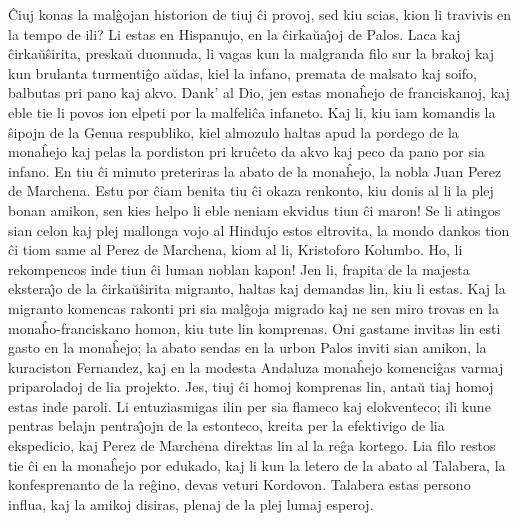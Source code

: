    \^Ciuj konas la mal\^gojan historion de tiuj \^ci provoj, sed kiu scias,
kion li travivis en la tempo de ili? Li estas en Hispanujo, en la
\^cirka\u ua\^{\j}oj de Palos. Laca kaj \^cirka\u u\^sirita,
preska\u u duonnuda, li vagas kun la malgranda filo sur la brakoj
kaj kun brulanta turmenti\^go a\u udas, kiel la infano, premata de
malsato kaj soifo, balbutas pri pano kaj akvo. Dank' al Dio, jen
estas mona\^hejo de franciskanoj, kaj eble tie li povos ion elpeti
por la malfeli\^ca infaneto. Kaj li, kiu iam komandis la \^sipojn de
la Genua respubliko, kiel almozulo haltas apud la pordego de la
mona\^hejo kaj pelas la pordiston pri kru\^ceto da akvo kaj peco da
pano por sia infano. En tiu \^ci minuto preteriras la abato de la
mona\^hejo, la nobla Juan Perez de Marchena. Estu por \^ciam benita
tiu \^ci okaza renkonto, kiu donis al li la plej bonan amikon, sen
kies helpo li eble neniam ekvidus tiun \^ci maron! Se li atingos
sian celon kaj plej mallonga vojo al Hindujo estos eltrovita, la
mondo dankos tion \^ci tiom same al Perez de Marchena, kiom al li,
Kristoforo Kolumbo. Ho, li rekompencos inde tiun \^ci luman noblan
kapon! Jen li, frapita de la majesta ekstera\^{\j}o de la \^cirka\u
u\^sirita migranto, haltas kaj demandas lin, kiu li estas. Kaj la
migranto komencas rakonti pri sia mal\^goja migrado kaj ne sen miro
trovas en la mona\^ho-franciskano homon, kiu tute lin komprenas. Oni
gastame invitas lin esti gasto en la mona\^hejo; la abato sendas en
la urbon Palos inviti sian amikon, la kuraciston Fernandez, kaj en
la modesta Andaluza mona\^hejo komenci\^gas varmaj priparoladoj de
lia projekto. Jes, tiuj \^ci homoj komprenas lin, anta\u u tiaj
homoj estas inde paroli. Li entuziasmigas ilin per sia flameco kaj
elokventeco; ili kune pentras belajn pentra\^{\j}ojn de la
estonteco, kreita per la efektivigo de lia ekspedicio, kaj Perez de
Marchena direktas lin al la re\^ga kortego. Lia filo restos tie \^ci
en la mona\^hejo por edukado, kaj li kun la letero de la abato al
Talabera, la konfesprenanto de la re\^gino, devas veturi Kordovon.
Talabera estas persono influa, kaj la amikoj disiras, plenaj de la
plej lumaj esperoj.

